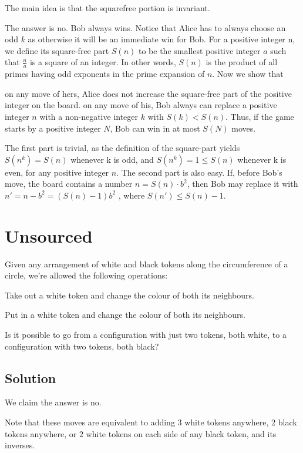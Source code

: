 \documentclass{article}
\begin{document}
The main idea is that the squarefree portion is invariant.

The answer is no. Bob always wins. Notice that Alice has to always choose an odd $k$ as otherwise it will be an immediate win for Bob. For a positive integer n, we define its square-free part
$S(n)$ to be the smallest positive integer $a$ such that $\frac{n}{a}$ is a square of an integer. In other words,
$S(n)$ is the product of all primes having odd exponents in the prime expansion of $n$.
Now we show that \begin{itemize}
    \Item on any move of hers, Alice does not increase the square-free part of the positive integer on the board.
    \Item on any move of his, Bob always can replace a positive integer $n$ with a non-negative integer $k$ with $S(k) < S(n)$. Thus, if the game starts by a positive integer $N$, Bob can win in at most $S(N)$ moves.
\end{itemize}  
The first part is trivial, as the definition of the square-part yields $S(n^k) = S(n)$ whenever k is odd, and $S(n^k) = 1 \leq S(n)$ whenever k is even, for any positive integer $n$.
The second part is also easy. If, before Bob’s move, the board contains a number $n = S(n)\cdot b^2$, then Bob may replace it with $n' = n - b^2 = (S(n) - 1)b^2$ , where $S(n') \leq S(n) - 1.$ 
 
\pagebreak\section{Unsourced}

Given any arrangement of white and black tokens along the circumference of a circle, we're allowed the following operations:
    \begin{itemize}
        \Item Take out a white token and change the colour of both its neighbours.
        
        \Item Put in a white token and change the colour of both its neighbours.
    \end{itemize}
    Is it possible to go from a configuration with just two tokens, both white, to a configuration with two tokens, both black?

\subsection{Solution}

We claim the answer is no.

Note that these moves are equivalent to adding $3$ white tokens anywhere, $2$ black tokens anywhere, or $2$ white tokens on each side of any black token, and its inverses.
\end{document}
